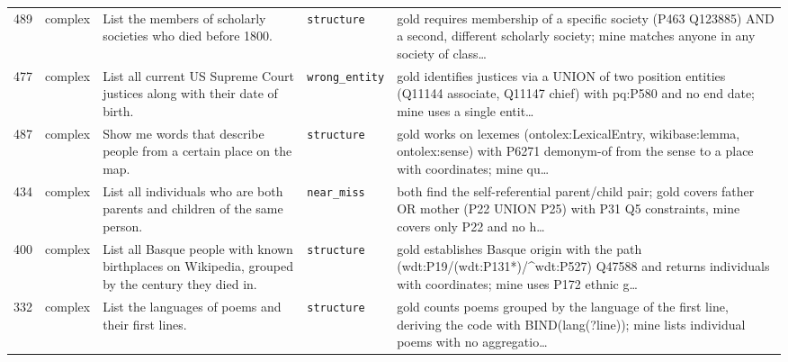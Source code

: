 \begin{longtable}{@{}r >{\raggedright\arraybackslash}p{1.7cm} >{\raggedright\arraybackslash}p{4.6cm} >{\raggedright\arraybackslash}p{2.5cm} >{\raggedright\arraybackslash}p{4.4cm}@{}}
489 & complex & List the members of scholarly societies who died before 1800. & \texttt{structure} & gold requires membership of a specific society (P463 Q123885) AND a second, different scholarly society; mine matches anyone in any society of class\ldots{} \\
477 & complex & List all current US Supreme Court justices along with their date of birth. & \texttt{wrong\_entity} & gold identifies justices via a UNION of two position entities (Q11144 associate, Q11147 chief) with pq:P580 and no end date; mine uses a single entit\ldots{} \\
487 & complex & Show me words that describe people from a certain place on the map. & \texttt{structure} & gold works on lexemes (ontolex:LexicalEntry, wikibase:lemma, ontolex:sense) with P6271 demonym-of from the sense to a place with coordinates; mine qu\ldots{} \\
434 & complex & List all individuals who are both parents and children of the same person. & \texttt{near\_miss} & both find the self-referential parent/\allowbreak{}child pair; gold covers father OR mother (P22 UNION P25) with P31 Q5 constraints, mine covers only P22 and no h\ldots{} \\
400 & complex & List all Basque people with known birthplaces on Wikipedia, grouped by the century they died in. & \texttt{structure} & gold establishes Basque origin with the path (wdt:P19/\allowbreak{}(wdt:P131*)/\allowbreak{}\textasciicircum{}wdt:P527) Q47588 and returns individuals with coordinates; mine uses P172 ethnic g\ldots{} \\
332 & complex & List the languages of poems and their first lines. & \texttt{structure} & gold counts poems grouped by the language of the first line, deriving the code with BIND(lang(?line)); mine lists individual poems with no aggregatio\ldots{} \\
\end{longtable}
\fussy\normalsize
